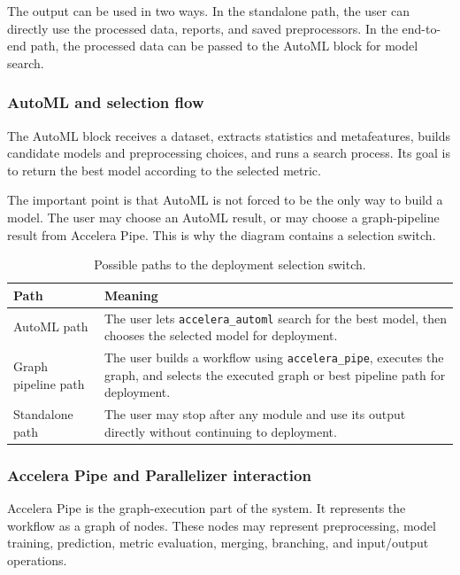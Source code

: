 \documentclass[12pt,a4paper]{report}
\newcommand{\acceleraTableStyle}{%
\small
\renewcommand{\arraystretch}{1.15}
\setlength{\tabcolsep}{4pt}%
}
\begin{document}
The output can be used in two ways. In the standalone path, the user can directly
use the processed data, reports, and saved preprocessors. In the end-to-end path,
the processed data can be passed to the AutoML block for model search.

\subsubsection*{AutoML and selection flow}

The AutoML block receives a dataset, extracts statistics and metafeatures, builds
candidate models and preprocessing choices, and runs a search process. Its goal
is to return the best model according to the selected metric.

The important point is that AutoML is not forced to be the only way to build a
model. The user may choose an AutoML result, or may choose a graph-pipeline
result from Accelera Pipe. This is why the diagram contains a selection switch.

\begin{table}[!htbp]
\centering
\acceleraTableStyle
\caption{Possible paths to the deployment selection switch.}
\label{tab:selection-switch-paths}
\begin{tabularx}{\textwidth}{p{}X}
\toprule
\textbf{Path} & \textbf{Meaning} \\
\midrule

AutoML path &
The user lets \texttt{accelera\_automl} search for the best model, then chooses
the selected model for deployment. \\
\midrule

Graph pipeline path &
The user builds a workflow using \texttt{accelera\_pipe}, executes the graph,
and selects the executed graph or best pipeline path for deployment. \\
\midrule

Standalone path &
The user may stop after any module and use its output directly without
continuing to deployment. \\

\bottomrule
\end{tabularx}
\end{table}

\subsubsection*{Accelera Pipe and Parallelizer interaction}

Accelera Pipe is the graph-execution part of the system. It represents the
workflow as a graph of nodes. These nodes may represent preprocessing, model
training, prediction, metric evaluation, merging, branching, and input/output
operations.
\end{document}

